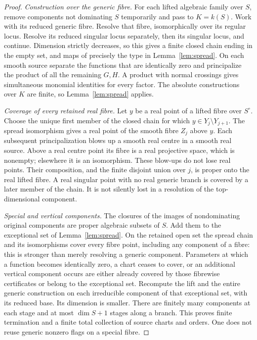 \begin{proof}
\emph{Construction over the generic fibre.}
For each lifted algebraic family over $S$, remove components not
dominating $S$ temporarily and pass to $K=k(S)$. Work with its reduced
generic fibre. Resolve that fibre, isomorphically over its regular locus.
Resolve its reduced singular locus separately, then its singular locus,
and continue. Dimension strictly decreases, so this gives a finite
closed chain ending in the empty set, and maps of precisely the type in
Lemma~\ref{lem:spread}. On each smooth source separate the functions that
are identically zero and principalize the product of all the remaining
$G,H$. A product with normal crossings gives simultaneous monomial
identities for every factor. The absolute constructions over $K$ are
finite, so Lemma~\ref{lem:spread} applies.

\emph{Coverage of every retained real fibre.}
Let $y$ be a real point of a lifted fibre over $S^\circ$. Choose the
unique first member of the closed chain for which
$y\in Y_j\setminus Y_{j+1}$. The spread isomorphism gives a real point
of the smooth fibre $Z_j$ above $y$. Each subsequent principalization
blows up a smooth real centre in a smooth real source. Above a real
centre point its fibre is a real projective space, which is nonempty;
elsewhere it is an isomorphism. These blow-ups do not lose real points.
Their composition, and the finite disjoint union over $j$, is proper
onto the real lifted fibre. A real singular point with no real generic
branch is covered by a later member of the chain. It is not silently
lost in a resolution of the top-dimensional component.

\emph{Special and vertical components.}
The closures of the images of nondominating original components are
proper algebraic subsets of $S$. Add them to the exceptional set of
Lemma~\ref{lem:spread}. On the retained open set the spread chain and
its isomorphisms cover every fibre point, including any component of a
fibre: this is stronger than merely resolving a generic component.
Parameters at which a function becomes identically zero, a chart ceases
to cover, or an additional vertical component occurs are either already
covered by those fibrewise certificates or belong to the exceptional
set. Recompute the lift and the entire generic construction on each
irreducible component of that exceptional set, with its reduced base.
Its dimension is smaller. There are finitely many components at each
stage and at most $\dim S+1$ stages along a branch. This proves finite
termination and a finite total collection of source charts and orders.
One does not reuse generic nonzero flags on a special fibre.


\end{proof}
